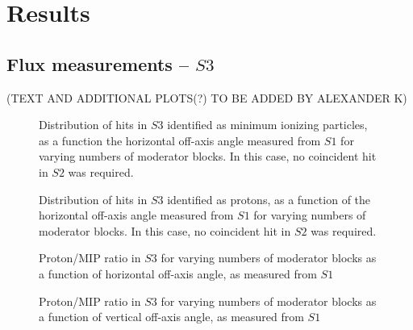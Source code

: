 \section{Results}
\label{hptpcPaper:sec:Results}

	\subsection{Flux measurements -- $S3$}
(TEXT AND ADDITIONAL PLOTS(?) TO BE ADDED BY ALEXANDER K)
	\begin{figure}[h]
		\begin{minipage}{0.48\textwidth}
			\begin{adjustbox}{max totalsize={\textwidth}{.35\textheight},center}
				
			\end{adjustbox}
			\caption{Distribution of hits in $S3$ identified as minimum ionizing particles, as a function the horizontal off-axis angle measured from $S1$ for varying numbers of moderator blocks. In this case, no coincident hit in $S2$ was required.}
			\label{fig:s1s3mips}
		\end{minipage}
		\hspace{0.3cm}
		\begin{minipage}{0.48\textwidth}
			\begin{adjustbox}{max totalsize={\textwidth}{.35\textheight},center}
				
			\end{adjustbox}
			\caption{Distribution of hits in $S3$ identified as protons, as a function of the horizontal off-axis angle measured from $S1$ for varying numbers of moderator blocks. In this case, no coincident hit in $S2$ was required.}
			\label{fig:s1s3protons}
		\end{minipage}
	\end{figure}

	\begin{figure}[ht]
		\begin{minipage}[t]{0.48\textwidth}
			\begin{adjustbox}{max totalsize={\textwidth}{.35\textheight}, center}
				
			\end{adjustbox}
			\caption{Proton/MIP ratio in $S3$ for varying numbers of moderator blocks as a function of horizontal off-axis angle, as measured from $S1$}
			\label{fig:propiratio_s3_horz}
		\end{minipage}
		\hspace{0.3cm}
		\begin{minipage}[t]{0.48\textwidth}
			\begin{adjustbox}{max totalsize={\textwidth}{.35\textheight}, center}
				
			\end{adjustbox}
			\caption{Proton/MIP ratio in $S3$ for varying numbers of moderator blocks as a function of vertical off-axis angle, as measured from $S1$}
			\label{fig:propiratio_s3_vert}
		\end{minipage}	
	\end{figure}

